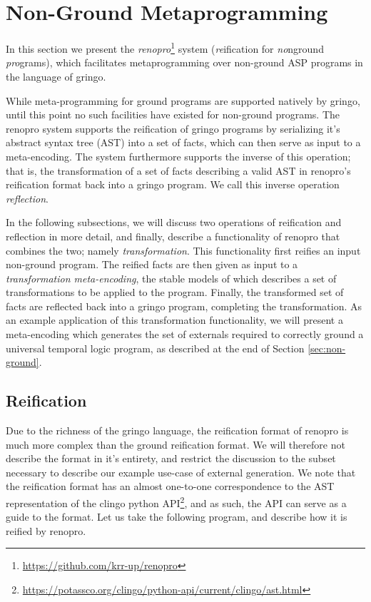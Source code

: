 \section{Non-Ground Metaprogramming}\label{sec:renopro}

In this section we present the
\emph{renopro}\footnote{\url{https://github.com/krr-up/renopro}}
system (\emph{re}ification for \emph{no}nground \emph{pro}grams), which
facilitates metaprogramming over non-ground ASP programs in the
language of gringo.

While meta-programming for ground programs are supported natively by
gringo, until this point no such facilities have existed for
non-ground programs. The renopro system supports the reification of
gringo programs by serializing it's abstract syntax tree (AST) into a
set of facts, which can then serve as input to a meta-encoding. The
system furthermore supports the inverse of this operation; that is,
the transformation of a set of facts describing a valid AST in
renopro's reification format back into a gringo program. We call this
inverse operation \emph{reflection}.

In the following subsections, we will discuss two operations of
reification and reflection in more detail, and finally, describe a
functionality of renopro that combines the two; namely
\emph{transformation}. This functionality first reifies an input
non-ground program. The reified facts are then given as input to a
\emph{transformation meta-encoding}, the stable models of which
describes a set of transformations to be applied to the
program. Finally, the transformed set of facts are reflected back into
a gringo program, completing the transformation. As an example
application of this transformation functionality, we will present a
meta-encoding which generates the set of externals required to
correctly ground a universal temporal logic program, as described at
the end of Section \ref{sec:non-ground}.

\subsection{Reification}

Due to the richness of the gringo language, the reification format of
renopro is much more complex than the ground reification format. We
will therefore not describe the format in it's entirety, and restrict
the discussion to the subset necessary to describe our example
use-case of external generation. We note that the reification format
has an almost one-to-one correspondence to the AST representation of
the clingo python
API\footnote{\url{https://potassco.org/clingo/python-api/current/clingo/ast.html}},
and as such, the API can serve as a guide to the format. Let us take
the following program, and describe how it is reified by renopro.

